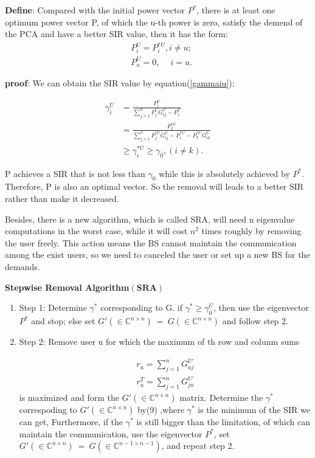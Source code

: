 \documentclass[conference]{IEEEtran}
\begin{document}
\textbf{Define}: Compared with the initial power vector $P^*$, there is at least one optimum power vector P, of which the u-th power is zero, satisfy the demend of the PCA and have a better SIR value, then it has the form:
\begin{align*}
&P_i^{U} = P_i^{*U}, i \neq u;\\
&P_u^U=0,  \quad\ i = u.
\end{align*}

\textbf{proof}: We can obtain the SIR value by equation(\ref{gammaiu}):

\begin{align*}
\gamma_i^U &= \frac{P_i^U}{\sum\limits_{j=1}^{n}P_j^UG^U_{ij}-P^U_i}\\& =\frac{P_I^{*U}}{\sum\limits_{j=1}^{n}P_j^{*U}G^U_{ij}-P^{*U}_i-P^{*U}_kG^U_{ik}}	\\
&\geq \gamma_i^{*U}\geq \gamma_0,( i \neq k).
\end{align*}	

P achieves a SIR that is not less than $\gamma_0$ while this is absolutely  achieved by $P^*$. Therefore, P is also an optimal vector. So the removal will leads to a better SIR rather than make it decreased. 

Besides, there is a new algorithm, which is called SRA, will need n eigenvalue computations in the worst case, while it will cost $n^2$ times roughly by removing the user freely. This action means the BS cannot maintain the communication among the exist users, so we need to canceled the user or set up a new BS for the demands.

\vspace*{3mm}
\textbf{Stepwise Removal Algorithm$\left( \textbf{SRA} \right)$}              
\begin{enumerate}
	\item Step 1: Determine $\gamma^*$ corresponding to G. if $\gamma^* \geq\gamma^U_0$, then use the eigenvector $P^*$ and stop; else set $ G' \left( \in\mathbb{C}^{n\times n}\right) \ =\ G\left( \in \mathbb{C}^{n\times n}\right)  $ and follow step 2.
	
	\item Step 2: Remove user u for which the maximum of th row and colunm sums
	
	\begin{align*}
	r_u = \sum_{j=1}^{n} G^{U'}_{uj}\\
	r_u^{T} = \sum_{j=1}^{n} G^{U'}_{ju}
	\end{align*}
	is maximized and form the $ G' \left( \in\mathbb{C}^{n\times n}\right)   $ matrix. 
	Determine the $\gamma^*$ correspoding to $ G' \left( \in\mathbb{C}^{n\times n}\right)   $ by(9) ,where $\gamma^*$ is the minimum of the SIR we can get, Furthermore, if the $\gamma^*$ is still bigger than the limitation, of which can maintain the communication, use the eigenvector $P^*$,  set $ G' \left( \in\mathbb{C}^{n\times n}\right) \ =\ G\left( \in \mathbb{C}^{n-1\times n-1}\right)  $, and repeat step 2.

\end{enumerate}
\end{document}
